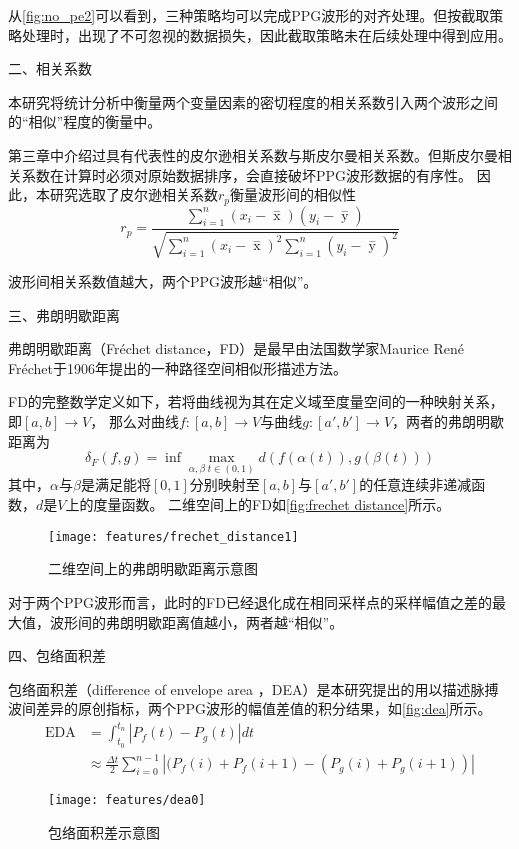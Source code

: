 从\autoref{fig:no_pe2}可以看到，三种策略均可以完成PPG波形的对齐处理。但按截取策略处理时，出现了不可忽视的数据损失，因此截取策略未在后续处理中得到应用。

二、相关系数

本研究将统计分析中衡量两个变量因素的密切程度的相关系数引入两个波形之间的“相似”程度的衡量中。

第三章中介绍过具有代表性的皮尔逊相关系数与斯皮尔曼相关系数。但斯皮尔曼相关系数在计算时必须对原始数据排序，会直接破坏PPG波形数据的有序性。
因此，本研究选取了皮尔逊相关系数$r_p$衡量波形间的相似性
\begin{equation}
    \label{equ:pearson2}
    r_p=\frac{\sum_{i=1}^n{(x_i- \mathop{x} \limits^-)(y_i- \mathop{y} \limits^-)}}{\sqrt{{\sum_{i=1}^n}{{(x_i- \mathop{x} \limits^-)^2\sum_{i=1}^n}{(y_i- \mathop{y} \limits^-)^2}}}}
\end{equation}

波形间相关系数值越大，两个PPG波形越“相似”。

三、弗朗明歇距离

弗朗明歇距离（Fréchet distance，FD）是最早由法国数学家Maurice René Fréchet于1906年提出的一种路径空间相似形描述方法\cite{Wien1994,Kaveh2013,GN2017,derohde2022}。

FD的完整数学定义如下，若将曲线视为其在定义域至度量空间的一种映射关系，即$[a,b]\rightarrow V$，
那么对曲线$f:[a,b]\rightarrow V$与曲线$g:[a',b']\rightarrow V$，两者的弗朗明歇距离为
\begin{equation}
    \label{equ:frechet distance}
    \delta_F(f,g)=\inf \max \limits_{\alpha,\beta \; t \in (0,1)} d(f(\alpha(t)), g(\beta(t)))
\end{equation}
其中，$\alpha$与$\beta$是满足能将$[0,1]$分别映射至$[a,b]$与$[a',b']$的任意连续非递减函数，$d$是$V$上的度量函数\cite{Wien1994}。
二维空间上的FD如\autoref{fig:frechet distance}所示。
\begin{figure}[htbp]
    \centering
    \texttt{[image: features/frechet\_distance1]}
    \caption{\label{fig:frechet distance}二维空间上的弗朗明歇距离示意图}
\end{figure}

对于两个PPG波形而言，此时的FD已经退化成在相同采样点的采样幅值之差的最大值，波形间的弗朗明歇距离值越小，两者越“相似”。

四、包络面积差

包络面积差（difference of envelope area ，DEA）是本研究提出的用以描述脉搏波间差异的原创指标，两个PPG波形的幅值差值的积分结果，如\autoref{fig:dea}所示。
\begin{equation}
    \label{equ:dea}
    \begin{aligned}
        \text{EDA} &= \int_{t_0}^{t_n}|P_f(t)-P_g(t)|dt\\
        &\approx \frac{\Delta t}{2} \sum_{i=0}^{n-1}{|(P_f(i)+P_f(i+1)-(P_g(i)+P_g(i+1))|}
    \end{aligned}
\end{equation}
\begin{figure}[htbp]
    \centering
    \texttt{[image: features/dea0]}
    \caption[包络面积差示意图]{\label{fig:dea}包络面积差示意图}
\end{figure}

